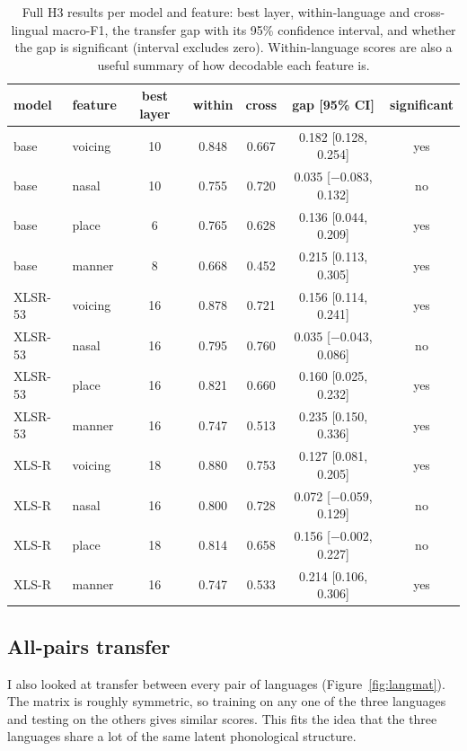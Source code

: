 \documentclass[twoside,11pt]{article}
\begin{document}
\begin{table}[t]
\centering
\small
\begin{tabular}{llccccc}
\toprule
model & feature & best layer & within & cross & gap [95\% CI] & significant \\
\midrule
base & voicing & 10 & 0.848 & 0.667 & 0.182 [0.128, 0.254] & yes \\
base & nasal   & 10 & 0.755 & 0.720 & 0.035 [$-$0.083, 0.132] & no \\
base & place   & 6  & 0.765 & 0.628 & 0.136 [0.044, 0.209] & yes \\
base & manner  & 8  & 0.668 & 0.452 & 0.215 [0.113, 0.305] & yes \\
\midrule
XLSR-53 & voicing & 16 & 0.878 & 0.721 & 0.156 [0.114, 0.241] & yes \\
XLSR-53 & nasal   & 16 & 0.795 & 0.760 & 0.035 [$-$0.043, 0.086] & no \\
XLSR-53 & place   & 16 & 0.821 & 0.660 & 0.160 [0.025, 0.232] & yes \\
XLSR-53 & manner  & 16 & 0.747 & 0.513 & 0.235 [0.150, 0.336] & yes \\
\midrule
XLS-R & voicing & 18 & 0.880 & 0.753 & 0.127 [0.081, 0.205] & yes \\
XLS-R & nasal   & 16 & 0.800 & 0.728 & 0.072 [$-$0.059, 0.129] & no \\
XLS-R & place   & 18 & 0.814 & 0.658 & 0.156 [$-$0.002, 0.227] & no \\
XLS-R & manner  & 16 & 0.747 & 0.533 & 0.214 [0.106, 0.306] & yes \\
\bottomrule
\end{tabular}
\caption{Full H3 results per model and feature: best layer, within-language and
cross-lingual macro-F1, the transfer gap with its 95\% confidence interval, and
whether the gap is significant (interval excludes zero). Within-language scores are
also a useful summary of how decodable each feature is.}
\label{tab:h3full}
\end{table}

\subsection{All-pairs transfer}
I also looked at transfer between every pair of languages
(Figure~\ref{fig:langmat}). The matrix is roughly symmetric, so training on any
one of the three languages and testing on the others gives similar scores. This
fits the idea that the three languages share a lot of the same latent
phonological structure.
\end{document}
